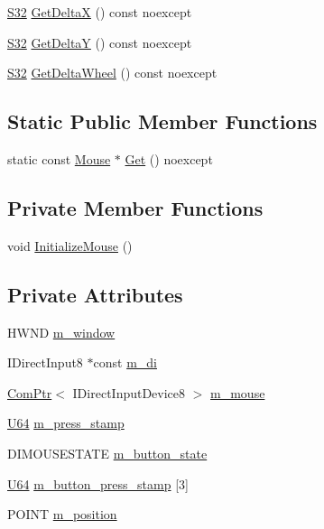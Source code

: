 \begin{DoxyCompactItemize}
\item 
\hyperlink{namespacemage_a642e05c5c83642b6946703615cdbf2da}{S32} \hyperlink{classmage_1_1_mouse_a1f6c7164c1705d834c2f603f22398077}{Get\+DeltaX} () const noexcept
\item 
\hyperlink{namespacemage_a642e05c5c83642b6946703615cdbf2da}{S32} \hyperlink{classmage_1_1_mouse_a95da9aa89fc63d4d96666da52e63d558}{Get\+DeltaY} () const noexcept
\item 
\hyperlink{namespacemage_a642e05c5c83642b6946703615cdbf2da}{S32} \hyperlink{classmage_1_1_mouse_ad683097cc0cec09eb5c2ad1b17bd729f}{Get\+Delta\+Wheel} () const noexcept
\end{DoxyCompactItemize}
\subsection*{Static Public Member Functions}
\begin{DoxyCompactItemize}
\item 
static const \hyperlink{classmage_1_1_mouse}{Mouse} $\ast$ \hyperlink{classmage_1_1_mouse_aa62bca1d085e86eeff1bf07e232e2a24}{Get} () noexcept
\end{DoxyCompactItemize}
\subsection*{Private Member Functions}
\begin{DoxyCompactItemize}
\item 
void \hyperlink{classmage_1_1_mouse_ac158b6d6fff5b05dea5ebefa86c0d56a}{Initialize\+Mouse} ()
\end{DoxyCompactItemize}
\subsection*{Private Attributes}
\begin{DoxyCompactItemize}
\item 
H\+W\+ND \hyperlink{classmage_1_1_mouse_ac4cb2f70b32a99c7acace534df46d35c}{m\+\_\+window}
\item 
I\+Direct\+Input8 $\ast$const \hyperlink{classmage_1_1_mouse_a892a9e1d5ad16ac9b67a5f69fbfedeab}{m\+\_\+di}
\item 
\hyperlink{namespacemage_ae74f374780900893caa5555d1031fd79}{Com\+Ptr}$<$ I\+Direct\+Input\+Device8 $>$ \hyperlink{classmage_1_1_mouse_a3f2803f3c0e008f5d764a11de3dbe098}{m\+\_\+mouse}
\item 
\hyperlink{namespacemage_a6672cf3c861707ce4a3235a3eb43941d}{U64} \hyperlink{classmage_1_1_mouse_a7633df92a818760b3efe694d4688961c}{m\+\_\+press\+\_\+stamp}
\item 
D\+I\+M\+O\+U\+S\+E\+S\+T\+A\+TE \hyperlink{classmage_1_1_mouse_a80591f7f27f026942f461c8af2ebbd1e}{m\+\_\+button\+\_\+state}
\item 
\hyperlink{namespacemage_a6672cf3c861707ce4a3235a3eb43941d}{U64} \hyperlink{classmage_1_1_mouse_aed4e1d8b806bec657f3d29a35c93ebf4}{m\+\_\+button\+\_\+press\+\_\+stamp} \mbox{[}3\mbox{]}
\item 
P\+O\+I\+NT \hyperlink{classmage_1_1_mouse_a690524744270b6ff762f5e8dcc552d28}{m\+\_\+position}
\end{DoxyCompactItemize}


